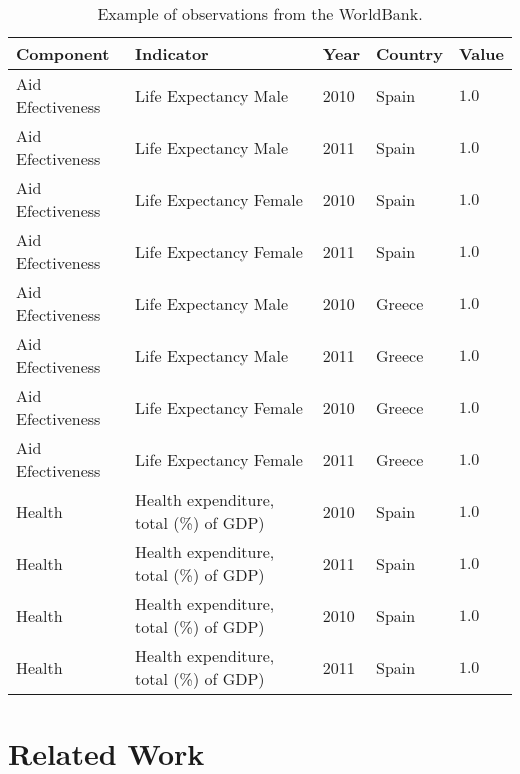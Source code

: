 \documentclass{llncs}
\begin{document}
\begin{table}[!htb]
\renewcommand{\arraystretch}{1.3}
\begin{center}
\begin{tabular}{|p{3cm}||p{5cm}|p{1.8cm}|p{1.8cm}|p{1cm}|}
\hline
  \textbf{Component} & \textbf{Indicator} & \textbf{Year} & \textbf{Country} & \textbf{Value}  \\  \hline
  Aid Efectiveness & Life Expectancy Male & 2010 & Spain & $1.0$ \\ \hline
  Aid Efectiveness & Life Expectancy Male & 2011 & Spain & $1.0$ \\ \hline
  Aid Efectiveness & Life Expectancy Female & 2010 & Spain & $1.0$ \\ \hline
  Aid Efectiveness & Life Expectancy Female & 2011 & Spain & $1.0$ \\ \hline
  Aid Efectiveness & Life Expectancy Male & 2010 & Greece & $1.0$ \\ \hline
  Aid Efectiveness & Life Expectancy Male & 2011 & Greece & $1.0$ \\ \hline
  Aid Efectiveness & Life Expectancy Female & 2010 & Greece & $1.0$ \\ \hline
  Aid Efectiveness & Life Expectancy Female & 2011 & Greece & $1.0$ \\ \hline
  Health & Health expenditure, total (\%) of GDP) & 2010 & Spain & $1.0$ \\ \hline
  Health & Health expenditure, total (\%) of GDP) & 2011 & Spain & $1.0$ \\ \hline
  Health & Health expenditure, total (\%) of GDP) & 2010 & Spain & $1.0$ \\ \hline
  Health & Health expenditure, total (\%) of GDP) & 2011 & Spain & $1.0$ \\ \hline
  \hline
  \end{tabular}
  \caption{Example of observations from the WorldBank.}
  \label{tab:example-wb}
  \end{center}
\end{table} 


\section{Related Work}

\end{document}
